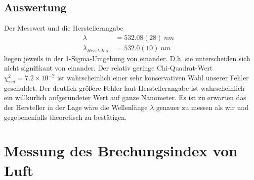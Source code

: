 \documentclass[a4paper,10pt]{article}
\begin{document}
\subsection{Auswertung}
Der Messwert und die Herstellerangabe
\begin{align*}
\lambda&=532.08(28)\:nm\\
\lambda_{Hersteller}&=532.0(10)\:nm
\end{align*}
liegen jeweils in der 1-Sigma-Umgebung von einander. D.h. sie unterscheiden sich nicht signifikant von einander. Der relativ geringe Chi-Quadrat-Wert
\(\chi^{2}_{red}=7.2\times10^{-2}\) ist wahrscheinlich einer sehr konservativen Wahl unserer Fehler geschuldet. Der deutlich größere Fehler laut Herstellerangabe ist wahrscheinlich ein willkürlich aufgerundeter Wert auf ganze Nanometer. Es ist zu erwarten das der Hersteller in der Lage wäre
die Wellenlänge \(\lambda \) genauer zu messen als wir und gegebenenfalls theoretisch zu bestätigen.
\pagebreak
\section{Messung des Brechungsindex von Luft}
\end{document}

